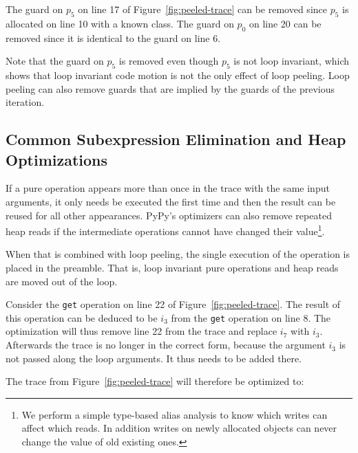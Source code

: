 \documentclass[preprint]{sigplanconf}
\begin{document}
The guard on $p_5$ on line 17 of Figure~\ref{fig:peeled-trace} can be
removed since $p_5$ is allocated on line 10 with a known class. The
guard on $p_0$ on line 20 can be removed since it is identical to the
guard on line 6.

Note that the guard on $p_5$ is removed even though $p_5$ is not loop
invariant, which shows that loop invariant code motion is not the only
effect of loop peeling. Loop peeling can also remove guards that are implied by
the guards of the previous iteration.



\subsection{Common Subexpression Elimination and Heap Optimizations}

If a pure operation appears more than once in the trace with the same input
arguments, it only needs be executed the first time and then the result
can be reused for all other appearances. PyPy's optimizers can also remove
repeated heap reads if the intermediate operations cannot have changed their
value\footnote{We perform a simple type-based alias analysis to know which
writes can affect which reads. In addition writes on newly allocated objects
can never change the value of old existing ones.}.

When that is combined with loop peeling, the single execution of the operation
is placed in the preamble. That is, loop invariant pure operations and heap
reads are moved out of the loop. 

Consider the \lstinline{get} operation on line 22 of
Figure~\ref{fig:peeled-trace}. The result of this operation can be
deduced to be $i_3$ from the \lstinline{get} operation on line
8. The optimization will thus remove line 22 from the trace and
replace $i_7$ with $i_3$. Afterwards the trace is no longer in the correct
form, because the argument $i_3$ is not passed along the loop arguments. It
thus needs to be added there.

The trace from Figure~\ref{fig:peeled-trace} will therefore be optimized to:
\end{document}
